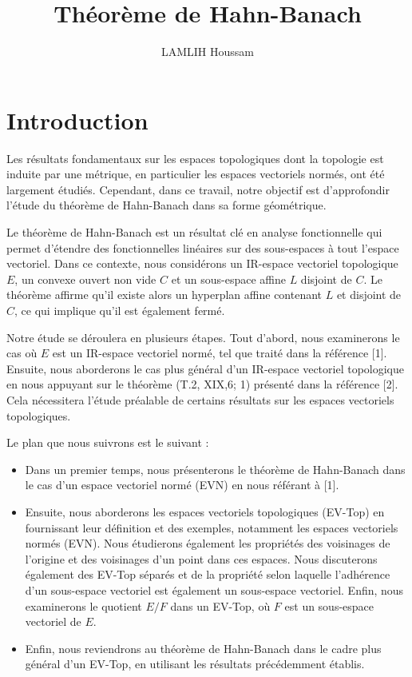 \documentclass{article}
\theoremstyle{definition}
\theoremstyle{plain}
\begin{document}
\title{Théorème de Hahn-Banach}
\author{LAMLIH Houssam}
\date{}

\maketitle




\tableofcontents

\section{Introduction}

Les résultats fondamentaux sur les espaces topologiques dont la topologie est induite par une métrique, en particulier les espaces vectoriels normés, ont été largement étudiés. Cependant, dans ce travail, notre objectif est d'approfondir l'étude du théorème de Hahn-Banach dans sa forme géométrique.

Le théorème de Hahn-Banach est un résultat clé en analyse fonctionnelle qui permet d'étendre des fonctionnelles linéaires sur des sous-espaces à tout l'espace vectoriel. Dans ce contexte, nous considérons un IR-espace vectoriel topologique $E$, un convexe ouvert non vide $C$ et un sous-espace affine $L$ disjoint de $C$. Le théorème affirme qu'il existe alors un hyperplan affine contenant $L$ et disjoint de $C$, ce qui implique qu'il est également fermé.

Notre étude se déroulera en plusieurs étapes. Tout d'abord, nous examinerons le cas où $E$ est un IR-espace vectoriel normé, tel que traité dans la référence [1]. Ensuite, nous aborderons le cas plus général d'un IR-espace vectoriel topologique en nous appuyant sur le théorème (T.2, XIX,6; 1) présenté dans la référence [2]. Cela nécessitera l'étude préalable de certains résultats sur les espaces vectoriels topologiques.

Le plan que nous suivrons est le suivant :
\begin{itemize}
    \item Dans un premier temps, nous présenterons le théorème de Hahn-Banach dans le cas d'un espace vectoriel normé (EVN) en nous référant à [1].
    \item Ensuite, nous aborderons les espaces vectoriels topologiques (EV-Top) en fournissant leur définition et des exemples, notamment les espaces vectoriels normés (EVN). Nous étudierons également les propriétés des voisinages de l'origine et des voisinages d'un point dans ces espaces. Nous discuterons également des EV-Top séparés et de la propriété selon laquelle l'adhérence d'un sous-espace vectoriel est également un sous-espace vectoriel. Enfin, nous examinerons le quotient $E/F$ dans un EV-Top, où $F$ est un sous-espace vectoriel de $E$.
    \item Enfin, nous reviendrons au théorème de Hahn-Banach dans le cadre plus général d'un EV-Top, en utilisant les résultats précédemment établis.
\end{itemize}
\end{document}
